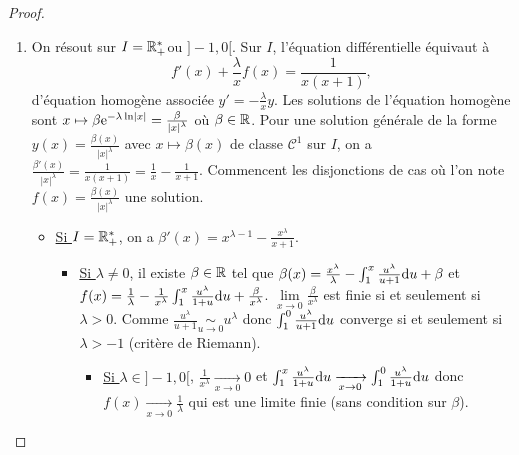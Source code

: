 \documentclass[12pt]{article}
\begin{document}
\begin{proof}
	\phantom{}
	\begin{enumerate}
		\item On résout sur $I=\mathbb{R}_{+}^{*}$ou $]-1,0[$. Sur $I$, l'équation différentielle équivaut à 
		\begin{equation}
			f'(x)+\frac{\lambda}{x}f(x)=\frac{1}{x(x+1)},
		\end{equation}
		d'équation homogène associée $y'=-\frac{\lambda}{x}y$. Les solutions de l'équation homogène sont $x\mapsto\beta\mathrm{e}^{-\lambda\ln\left\lvert x\right\rvert}=\frac{\beta}{\left\lvert x\right\rvert^{\lambda}}$ où $\beta\in\mathbb{R}$.
		Pour une solution générale de la forme $y(x)=\frac{\beta(x)}{\left\lvert x\right\rvert^{\lambda}}$ avec $x\mapsto\beta(x)$ de classe $\mathcal{C}^{1}$ sur $I$, on a $\frac{\beta'(x)}{\left\lvert x\right\rvert^{\lambda}}=\frac{1}{x(x+1)}=\frac{1}{x}-\frac{1}{x+1}$. Commencent les disjonctions de cas où l'on note $f(x)=\frac{\beta(x)}{\left\lvert x\right\rvert^{\lambda}}$ une solution.

		\begin{itemize}
			\item \underline{Si $I=\mathbb{R}_{+}^{*}$}, on a $\beta'(x)=x^{\lambda-1}-\frac{x^{\lambda}}{x+1}$.
			
			\begin{itemize}
				\item \underline{Si $\lambda\neq0$}, il existe $\beta\in\mathbb{R}$ tel que $\beta(x)=\frac{x^{\lambda}}{\lambda}-\int_{1}^{x}\frac{u^{\lambda}}{u+1}\mathrm{d} u+\beta$ et $f(x)=\frac{1}{\lambda}-\frac{1}{x^{\lambda}}\int_{1}^{x}\frac{u^{\lambda}}{1+u}\mathrm{d} u+\frac{\beta}{x^{\lambda}}$. $\lim\limits_{x\to0}\frac{\beta}{x^{\lambda}}$ est finie si et seulement si $\lambda>0$. Comme $\frac{u^{\lambda}}{u+1}\underset{u\to0}{\sim}u^{\lambda}$ donc $\int_{1}^{0}\frac{u^{\lambda}}{u+1}\mathrm{d} u$ converge si et seulement si $\lambda>-1$ (critère de Riemann).
				
				\begin{itemize}
					\item \underline{Si $\lambda\in]-1,0[$}, $\frac{1}{x^{\lambda}}\xrightarrow[x\to0]{}0$ et $\int_{1}^{x}\frac{u^{\lambda}}{1+u}\mathrm{d} u\xrightarrow[x\to0]{}\int_{1}^{0}\frac{u^{\lambda}}{1+u}\mathrm{d} u$ donc $f(x)\xrightarrow[x\to0]{}\frac{1}{\lambda}$ qui est une limite finie (sans condition sur $\beta$).
					

\end{itemize}
\end{itemize}
\end{itemize}
\end{enumerate}
\end{proof}
\end{document}
